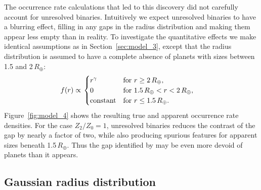 \documentclass[12pt,modern]{aastex61}
\begin{document}
The occurrence rate calculations that led to this discovery did not
carefully account for unresolved binaries.  Intuitively we expect
unresolved binaries to have a blurring effect, filling in any gaps in
the radius distribution and making them appear less empty than in
reality.  To investigate the quantitative effects we make identical
assumptions as in Section~\ref{sec:model_3}, except that the radius
distribution is assumed to have a complete absence of planets with
sizes between 1.5 and 2\,$R_\oplus$:
\begin{align}
    f(r)
    &\propto
    \left.
    \begin{cases}
        r^\gamma & \text{for } r\geq 2\,R_\oplus, \\
        0 & \text{for } 1.5\,R_\oplus < r < 2\,R_\oplus, \\
        {\rm constant} & \text{for } r\leq 1.5\,R_\oplus.
    \end{cases}
    \right.
    \label{eq:model4_radius_distribution}
\end{align}
Figure~\ref{fig:model_4} shows the resulting true and apparent
occurrence rate densities.  For the case $Z_2/Z_0=1$, unresolved
binaries reduces the contrast of the gap by nearly a factor of two,
while also producing spurious features for apparent sizes beneath
1.5\,$R_\oplus$.  Thus the gap identified by
\citet{fulton_california-_2017} may be even more devoid of planets
than it appears.


\subsection{Gaussian radius distribution}
\end{document}
